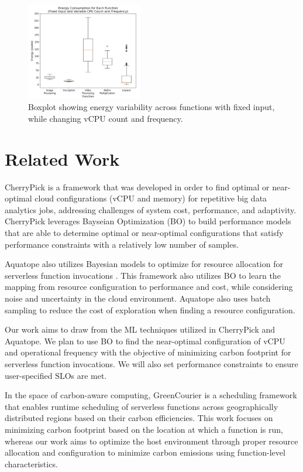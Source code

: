 \documentclass[times, 10pt,twocolumn]{article}
\begin{document}
\begin{figure}[ht]
   \centering
   \includegraphics[width=0.45\textwidth]{imgs/energy_boxplot.png}
   \caption{Boxplot showing energy variability across functions with fixed input, while changing vCPU count and frequency. }
   \label{fig:energy_boxplot}
 \end{figure}
\section{Related Work}
CherryPick\cite{CherryPick} is a framework that was developed in order to find optimal or near-optimal cloud configurations (vCPU and memory) for repetitive big data analytics jobs, addressing challenges of system cost, performance, and adaptivity. CherryPick leverages Bayseian Optimization (BO) to build performance models that are able to determine optimal or near-optimal configurations that satisfy performance constraints with a relatively low number of samples. 

Aquatope also utilizes Bayesian models to optimize for resource allocation for serverless function invocations \cite{AQUATOPE}. This framework also utilizes BO to learn the mapping from resource configuration to performance and cost, while considering noise and uncertainty in the cloud environment. Aquatope also uses batch sampling to reduce the cost of exploration when finding a resource configuration.

Our work aims to draw from the ML techniques utilized in CherryPick and Aquatope. We plan to use BO to find the near-optimal configuration of vCPU and operational frequency with the objective of minimizing carbon footprint for serverless function invocations. We will also set performance constraints to ensure user-specified SLOs are met.

In the space of carbon-aware computing, GreenCourier \cite{GreenCourier} is a scheduling framework that enables runtime scheduling of serverless functions across geographically distributed regions based on their carbon efficiencies. This work focuses on minimizing carbon footprint based on the location at which a function is run, whereas our work aims to optimize the host environment through proper resource allocation and configuration to minimize carbon emissions using function-level characteristics.
\end{document}

